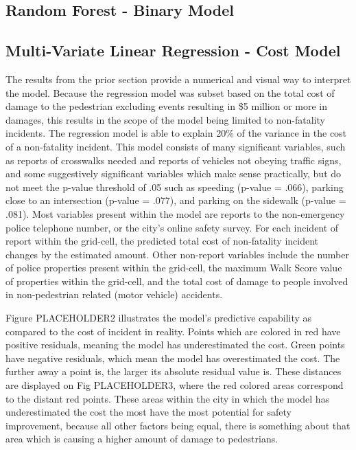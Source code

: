 \documentclass{llncs}
\begin{document}
\subsection{Random Forest - Binary Model}

\subsection{Multi-Variate Linear Regression - Cost Model}
The results from the prior section provide a numerical and visual way to interpret the model. Because the regression model was subset based on the total cost of damage to the pedestrian excluding events resulting in \$5 million or more in damages, this results in the scope of the model being limited to non-fatality incidents. The regression model is able to explain 20\% of the variance in the cost of a non-fatality incident. This model consists of many significant variables, such as reports of crosswalks needed and reports of vehicles not obeying traffic signs, and some suggestively significant variables which make sense practically, but do not meet the p-value threshold of .05 such as speeding (p-value = .066), parking close to an intersection (p-value = .077), and parking on the sidewalk (p-value = .081). Most variables present within the model are reports to the non-emergency police telephone number, or the city’s online safety survey. For each incident of report within the grid-cell, the predicted total cost of non-fatality incident changes by the estimated amount. Other non-report variables include the number of police properties present within the grid-cell, the maximum Walk Score value of properties within the grid-cell, and the total cost of damage to people involved in non-pedestrian related (motor vehicle) accidents. 

Figure PLACEHOLDER2 illustrates the model’s predictive capability as compared to the cost of incident in reality. Points which are colored in red have positive residuals, meaning the model has underestimated the cost. Green points have negative residuals, which mean the model has overestimated the cost. The further away a point is, the larger its absolute residual value is. These distances are displayed on Fig PLACEHOLDER3, where the red colored areas correspond to the distant red points. These areas within the city in which the model has underestimated the cost the most have the most potential for safety improvement, because all other factors being equal, there is something about that area which is causing a higher amount of damage to pedestrians.
\end{document}
